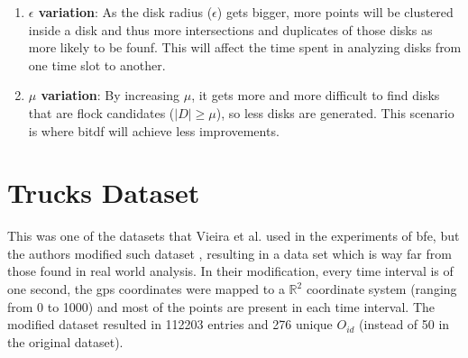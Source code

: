 {\begin{enumerate}
    \item \textbf{$\epsilon$ variation}: As the disk radius ($\epsilon$) gets bigger, more points will be clustered
        inside a disk and thus more intersections and duplicates of those disks as more likely to be founf. This will
        affect the time spent in analyzing disks from one time slot to another. \label{sssec:gvariation}

    \item \textbf{$\mu$ variation}: By increasing $\mu$, it gets more and more difficult to find disks that are flock
        candidates ($|D| \ge \mu$), so less disks are generated. This scenario is where \ac{bitdf} will achieve less
        improvements. \label{sssec:nvariation}
\end{enumerate}

\section{Trucks Dataset}
\label{sec:trucks}
This was one of the datasets that Vieira et al. \citep{vieira} used in the experiments of \ac{bfe}, but the authors
modified such dataset \citep{trucksdataset}, resulting in a data set which is way far from those found in real world
analysis. In their modification, every time interval is of one second, the \ac{gps} coordinates were mapped to a
$\mathbb{R}^2$ coordinate system (ranging from 0 to 1000) and most of the points are present in each time interval. The
modified dataset resulted in 112203 entries and 276 unique $O_{id}$ (instead of 50 in the original dataset).

}
